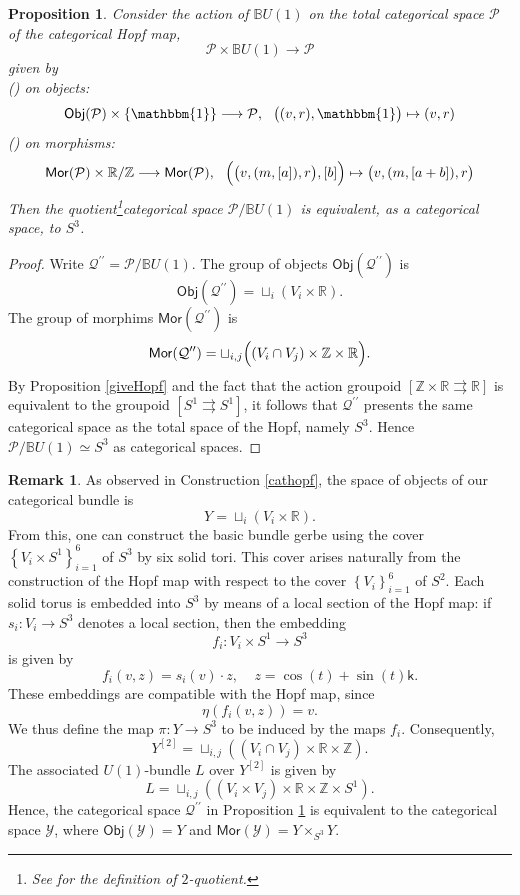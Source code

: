 \documentclass{article}
\theoremstyle{plain}
\newtheorem{prop}[thm]{Proposition}
\theoremstyle{definition}
\newtheorem{rem}[thm]{Remark}
\newcommand{\rNum}[1]{\lowercase\expandafter{\romannumeral #1\relax}}
\begin{document}
\begin{prop}\label{modbu}
Consider the action of $\mathbb{B}U(1)$ on the total categorical space $\mathcal{P}$ of the categorical Hopf map,
\[
\mathcal{P} \times \mathbb{B}U(1) \longrightarrow \mathcal{P}
\]
given by \\
(\rNum{1}) on objects:
\[
\mathsf{Obj}(\mathcal{P}) \times \left\{\mathbbm{1}\right\} \longrightarrow \mathcal{P}, ~~ \bigl((v,r),\mathbbm{1}\bigr) \mapsto (v,r)
\]
(\rNum{2}) on morphisms:
\[
\mathsf{Mor}(\mathcal{P}) \times \mathbb{R}/\mathbb{Z} \longrightarrow \mathsf{Mor}(\mathcal{P}), ~~ \Bigl(\bigl(v,(m,[a]),r\bigr),[b]\Bigr) \mapsto \bigl(v,(m,[a+b]),r\bigr)
\]
Then the quotient\footnote{See \cite{MR2709030} for the definition of $2$-quotient.}categorical space $\mathcal{P}/\mathbb{B}U(1)$ is equivalent, as a categorical space, to $S^3$.
\end{prop}
\begin{proof}
Write $\mathcal{Q}^{\prime\prime} = \mathcal{P}/\mathbb{B}U(1)$. The group of objects $\mathsf{Obj}(\mathcal{Q}^{\prime\prime})$ is
\[
\mathsf{Obj}(\mathcal{Q}^{\prime\prime}) = \sqcup_i (V_i \times \mathbb{R}).
\]
The group of morphims $\mathsf{Mor}(\mathcal{Q}^{\prime\prime})$ is
\[
\mathsf{Mor}(\mathcal{Q}^{\prime\prime}) = \sqcup_{i,j} \Bigl((V_i \cap V_j) \times \mathbb{Z} \times \mathbb{R}\Bigr).
\]
By Proposition \ref{giveHopf} and the fact that the action groupoid $[\mathbb{Z} \times \mathbb{R} \rightrightarrows \mathbb{R}]$ is equivalent to the groupoid $[S^1 \rightrightarrows S^1]$, it follows that $\mathcal{Q}^{\prime\prime}$ presents the same categorical space as the total space of the Hopf, namely $S^3$. Hence $\mathcal{P}/\mathbb{B}U(1) \simeq S^3$ as categorical spaces.
\end{proof}
\begin{rem}\label{spacey2andl}
As observed in Construction \ref{cathopf}, the space of objects of our categorical bundle is
\[
Y = \sqcup_i (V_i \times \mathbb{R}).
\]
From this, one can construct the basic bundle gerbe using the cover $\left\{V_i \times S^1\right\}_{i=1}^6$ of $S^3$ by six solid tori. This cover arises naturally from the construction of the Hopf map with respect to the cover $\left\{V_i\right\}_{i=1}^6$ of $S^2$. Each solid torus is embedded into $S^3$ by means of a local section of the Hopf map: if $s_i:V_i \longrightarrow S^3$ denotes a local section, then the embedding 
$$f_i:V_i \times S^1 \longrightarrow S^3$$
is given by
\[
f_i(v,z) = s_i(v) \cdot z, ~~~~~ z = \cos(t) + \sin(t) \mathsf{k}.
\]
These embeddings are compatible with the Hopf map, since
\[
\eta\left(f_i(v,z)\right) = v.
\]
We thus define the map $\pi:Y \longrightarrow S^3$ to be induced by the maps $f_i$. Consequently,
\[
Y^{[2]} = \sqcup_{i,j} \left((V_i \cap V_j) \times \mathbb{R} \times \mathbb{Z}\right).
\]
The associated $U(1)$-bundle $L$ over $Y^{[2]}$ is given by
\[
L = \sqcup_{i,j} \left((V_i \times V_j) \times \mathbb{R} \times \mathbb{Z} \times S^1\right).
\]
Hence, the categorical space $\mathcal{Q}^{\prime\prime}$ in Proposition \ref{modbu} is equivalent to the categorical space $\mathcal{Y}$, where $\mathsf{Obj}(\mathcal{Y}) = Y$ and $\mathsf{Mor}(\mathcal{Y}) = Y \times_{S^3} Y$.
\end{rem}
\end{document}
